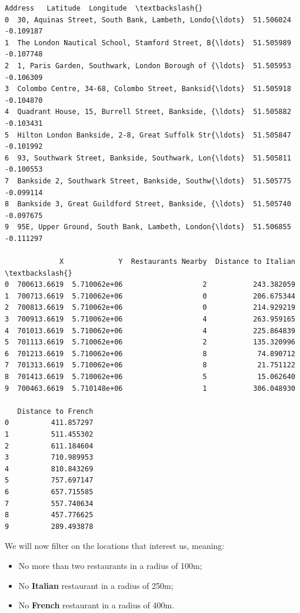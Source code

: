 \documentclass[11pt]{article}
\makeatletter
\newcommand{\boxspacing}{\kern\kvtcb@left@rule\kern\kvtcb@boxsep}
\newcommand{\prompt}[4]{
        \ttfamily\llap{{\color{#2}[#3]:\hspace{3pt}#4}}\vspace{-\baselineskip}
    }
\makeatother
\begin{document}
            \begin{tcolorbox}[breakable, size=fbox, boxrule=.5pt, pad at break*=1mm, opacityfill=0]
\prompt{Out}{outcolor}{92}{\boxspacing}
\begin{Verbatim}[commandchars=\\\{\}]
                                             Address   Latitude  Longitude  \textbackslash{}
0  30, Aquinas Street, South Bank, Lambeth, Londo{\ldots}  51.506024  -0.109187
1  The London Nautical School, Stamford Street, B{\ldots}  51.505989  -0.107748
2  1, Paris Garden, Southwark, London Borough of {\ldots}  51.505953  -0.106309
3  Colombo Centre, 34-68, Colombo Street, Banksid{\ldots}  51.505918  -0.104870
4  Quadrant House, 15, Burrell Street, Bankside, {\ldots}  51.505882  -0.103431
5  Hilton London Bankside, 2-8, Great Suffolk Str{\ldots}  51.505847  -0.101992
6  93, Southwark Street, Bankside, Southwark, Lon{\ldots}  51.505811  -0.100553
7  Bankside 2, Southwark Street, Bankside, Southw{\ldots}  51.505775  -0.099114
8  Bankside 3, Great Guildford Street, Bankside, {\ldots}  51.505740  -0.097675
9  95E, Upper Ground, South Bank, Lambeth, London{\ldots}  51.506855  -0.111297

             X             Y  Restaurants Nearby  Distance to Italian  \textbackslash{}
0  700613.6619  5.710062e+06                   2           243.382059
1  700713.6619  5.710062e+06                   0           206.675344
2  700813.6619  5.710062e+06                   0           214.929219
3  700913.6619  5.710062e+06                   4           263.959165
4  701013.6619  5.710062e+06                   4           225.864839
5  701113.6619  5.710062e+06                   2           135.320996
6  701213.6619  5.710062e+06                   8            74.890712
7  701313.6619  5.710062e+06                   8            21.751122
8  701413.6619  5.710062e+06                   5            15.062640
9  700463.6619  5.710148e+06                   1           306.048930

   Distance to French
0          411.857297
1          511.455302
2          611.184604
3          710.989953
4          810.843269
5          757.697147
6          657.715585
7          557.740634
8          457.776625
9          289.493878
\end{Verbatim}
\end{tcolorbox}
        
    We will now filter on the locations that interest us, meaning:
\begin{itemize}
\item
    No more than two restaurants in a radius of 100m;
\item
    No \textbf{Italian} restaurant in a radius of 250m;
\item
    No \textbf{French} restaurant in a radius of 400m.
\end{itemize}
\end{document}
